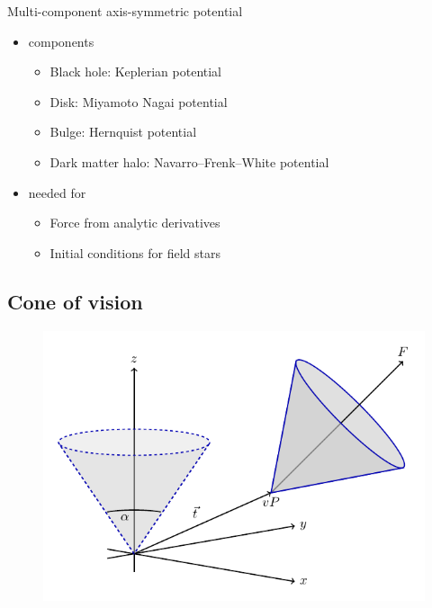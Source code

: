 \documentclass{beamer}
\begin{document}
\begin{frame}

Multi-component axis-symmetric potential

\begin{itemize}
\item components
	\begin{itemize}
	\item Black hole: Keplerian potential
	\item Disk: Miyamoto Nagai potential
	\item Bulge: Hernquist potential
	\item Dark matter halo: Navarro–Frenk–White potential
	\end{itemize}
\item needed for
	\begin{itemize}
	\item Force from analytic derivatives
	\item Initial conditions for field stars
	\end{itemize}
\end{itemize}

\end{frame}

\subsection{Cone of vision}

\begin{frame}
\begin{figure}
\centering
\includegraphics[width=0.9\linewidth]{Images/cone.pdf}
\end{figure}
\end{frame}
\end{document}
